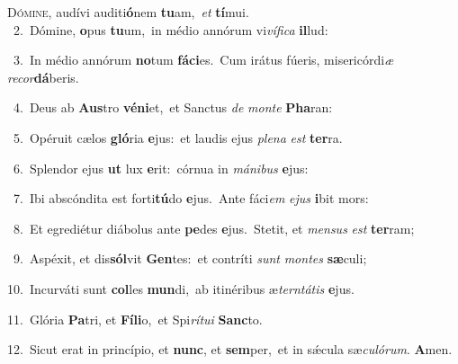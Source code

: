 \lettrine{\initial\textcolor{\initialcolor}{D}}{ómine,} audívi auditi\-\textbf{ó}\-nem \textbf{tu}\-am,~\star \textit{et} \textbf{tí}\-mui.\\
{\numbfont\textcolor{\numbcolor}{~2.}}~Dómine, \textbf{o}\-pus \textbf{tu}\-um,~\star in médio annórum vi\-\textit{ví}\-\textit{fi}\textit{ca} \textbf{il}\-lud:\par
{\numbfont\textcolor{\numbcolor}{~3.}}~In médio annórum \textbf{no}\-tum \textbf{fá}\-\textbf{ci}es.~\star Cum irátus fúeris, misericórdi\textit{æ} \textit{re}\-\textit{cor}\textbf{dá}beris.\par
{\numbfont\textcolor{\numbcolor}{~4.}}~Deus ab \textbf{Aus}\-tro \textbf{vé}\-\textbf{ni}et,~\star et Sanctus \textit{de} \textit{mon}\-\textit{te} \textbf{Pha}\-ran:\par
{\numbfont\textcolor{\numbcolor}{~5.}}~Opéruit cælos \textbf{gló}\-ria \textbf{e}\-jus:~\star et laudis ejus \textit{ple}\-\textit{na} \textit{est} \textbf{ter}\-ra.\par
{\numbfont\textcolor{\numbcolor}{~6.}}~Splendor ejus \textbf{ut} lux \textbf{e}\-rit:~\star córnua in \textit{má}\-\textit{ni}\textit{bus} \textbf{e}\-jus:\par
{\numbfont\textcolor{\numbcolor}{~7.}}~Ibi abscóndita est forti\-\textbf{tú}\-do \textbf{e}\-jus.~\star Ante fáci\textit{em} \textit{e}\-\textit{jus} \textbf{i}\-bit mors:\par
{\numbfont\textcolor{\numbcolor}{~8.}}~Et egrediétur diábolus ante \textbf{pe}\-des \textbf{e}\-jus.~\star Stetit, et \textit{men}\-\textit{sus} \textit{est} \textbf{ter}\-ram;\par
{\numbfont\textcolor{\numbcolor}{~9.}}~Aspéxit, et dis\-\textbf{sól}\-vit \textbf{Gen}\-tes:~\star et contríti \textit{sunt} \textit{mon}\-\textit{tes} \textbf{sæ}\-culi;\par
{\numbfont\textcolor{\numbcolor}{10.}}~Incurváti sunt \textbf{col}\-les \textbf{mun}\-di,~\star ab itinéribus æ\-\textit{tern}\-\textit{tá}\textit{tis} \textbf{e}\-jus.\par
{\numbfont\textcolor{\numbcolor}{11.}}~Glória \textbf{Pa}\-tri, et \textbf{Fí}\-\textbf{li}o,~\star et Spi\-\textit{rí}\-\textit{tu}\textit{i} \textbf{Sanc}\-to.\par
{\numbfont\textcolor{\numbcolor}{12.}}~Sicut erat in princípio, et \textbf{nunc}\-, et \textbf{sem}\-per,~\star et in sǽcula sæ\-\textit{cu}\-\textit{ló}\textit{rum}. \textbf{A}\-men.\par
